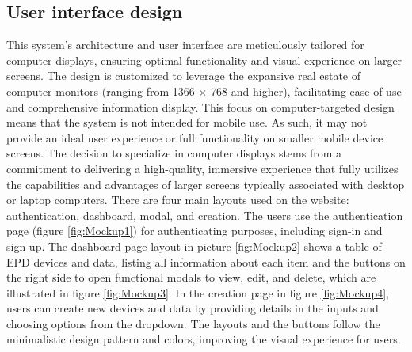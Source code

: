 \documentclass[../Main.tex]{subfiles}
\begin{document}
\subsection{User interface design}
This system's architecture and user interface are meticulously tailored for computer displays, ensuring optimal functionality and visual experience on larger screens. The design is customized to leverage the expansive real estate of computer monitors (ranging from 1366 \(\times\) 768 and higher), facilitating ease of use and comprehensive information display. This focus on computer-targeted design means that the system is not intended for mobile use. As such, it may not provide an ideal user experience or full functionality on smaller mobile device screens. The decision to specialize in computer displays stems from a commitment to delivering a high-quality, immersive experience that fully utilizes the capabilities and advantages of larger screens typically associated with desktop or laptop computers. There are four main layouts used on the website: authentication, dashboard, modal, and creation. The users use the authentication page (figure \ref{fig:Mockup1}) for authenticating purposes, including sign-in and sign-up. The dashboard page layout in picture \ref{fig:Mockup2} shows a table of \gls{EPD} devices and data, listing all information about each item and the buttons on the right side to open functional modals to view, edit, and delete, which are illustrated in figure \ref{fig:Mockup3}. In the creation page in figure \ref{fig:Mockup4}, users can create new devices and data by providing details in the inputs and choosing options from the dropdown. The layouts and the buttons follow the minimalistic design pattern and colors, improving the visual experience for users.
\end{document}
